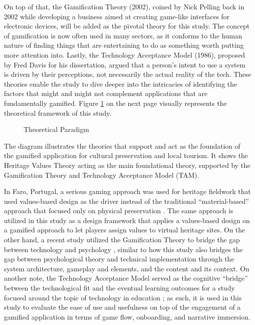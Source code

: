 \documentclass{research}
\begin{document}
On top of that, the Gamification Theory (2002), coined by Nick Pelling back in 2002
while developing a business aimed at creating game-like interfaces for electronic
devices, will be added as the pivotal theory for this study. The concept of gamification
is now often used in many sectors, as it conforms to the human nature of finding things
that are entertaining to do as something worth putting more attention into. Lastly, the
Technology Acceptance Model (1986), proposed by Fred Davis for his dissertation, argued
that a person's intent to use a system is driven by their perceptions, not necessarily
the actual reality of the tech. These theories enable the study to dive deeper into the
intricacies of identifying the factors that might and might not complement applications
that are fundamentally gamified. Figure \ref{fig:theoretical_paradigm} on the next page
visually represents the theoretical framework of this study.

\begin{figure}[h!]
  \centering
  \caption{Theoretical Paradigm}
  \label{fig:theoretical_paradigm}
\end{figure}

The diagram illustrates the theories that support and act as the foundation of the
gamified application for cultural preservation and local tourism. It shows the Heritage
Values Theory acting as the main foundational theory, supported by the Gamification
Theory and Technology Acceptance Model (TAM).

In Faro, Portugal, a serious gaming approach was used for heritage fieldwork that used
values-based design as the driver instead of the traditional ``material-based'' approach
that focused only on physical preservation \citep{andrade2025}. The same approach is
utilized in this study as a design framework that applies a values-based design on a
gamified approach to let players assign values to virtual heritage sites. On the other
hand, a recent study utilized the Gamification Theory to bridge the gap between
technology and psychology \citep{oliveira2025}, similar to how this study also bridges
the gap between psychological theory and technical implementation through the system
architecture, gameplay and elements, and the content and its context. On another note,
the Technology Acceptance Model served as the cognitive ``bridge'' between the
technological fit and the eventual learning outcomes for a study focused around the
topic of technology in education \citep{rahmi2026}; as such, it is used in this study
to evaluate the ease of use and usefulness on top of the engagement of a gamified
application in terms of game flow, onboarding, and narrative immersion.
\end{document}
